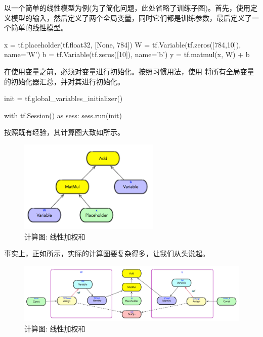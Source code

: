 \begin{content}

以一个简单的线性模型为例(为了简化问题，此处省略了训练子图)。首先，使用定义模型的输入，然后定义了两个全局变量，同时它们都是训练参数，最后定义了一个简单的线性模型。

\begin{leftbar}
\begin{python}
x  = tf.placeholder(tf.float32, [None, 784])
W = tf.Variable(tf.zeros([784,10]), name='W')
b = tf.Variable(tf.zeros([10]), name='b') 
y = tf.matmul(x, W) + b
\end{python}
\end{leftbar}

在使用变量之前，必须对变量进行初始化。按照习惯用法，使用
将所有全局变量的初始化器汇总，并对其进行初始化。

\begin{leftbar}
\begin{python}
init = tf.global_variables_initializer()

with tf.Session() as sess:
  sess.run(init)
\end{python}
\end{leftbar}

按照既有经验，其计算图大致如所示。

\begin{figure}[!h]
\centering
\includegraphics[width=0.6\textwidth]{figures/tf-linear-model.png}
\caption{计算图: 线性加权和}
 \label{fig:tf-linear-model}
\end{figure}

事实上，正如所示，实际的计算图要复杂得多，让我们从头说起。

\begin{figure}[!h]
\centering
\includegraphics[width=1.0\textwidth]{figures/tf-real-linear-model.png}
\caption{计算图: 线性加权和}
 \label{fig:tf-real-linear-model}
\end{figure}

\end{content}

